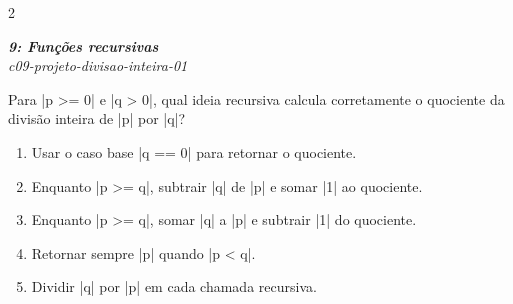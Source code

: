 \documentclass[a4paper,10pt,brazil]{article}
\begin{document}
\begin{multicols}{2}
\begin{enumerate}
\end{enumerate}

\begin{flushright}
  \footnotesize
  \textit{\textbf{9: Funções recursivas}}\\
  \textit{c09-projeto-divisao-inteira-01}\\

\end{flushright}
Para \haskellinline|p >= 0| e \haskellinline|q > 0|, qual ideia recursiva calcula corretamente o quociente da divisão inteira de \haskellinline|p| por \haskellinline|q|?

\begin{enumerate}
  \item Usar o caso base \haskellinline|q == 0| para retornar o quociente.

  \item Enquanto \haskellinline|p >= q|, subtrair \haskellinline|q| de \haskellinline|p| e somar \haskellinline|1| ao quociente.

  \item Enquanto \haskellinline|p >= q|, somar \haskellinline|q| a \haskellinline|p| e subtrair \haskellinline|1| do quociente.

  \item Retornar sempre \haskellinline|p| quando \haskellinline|p < q|.

  \item Dividir \haskellinline|q| por \haskellinline|p| em cada chamada recursiva.


\end{enumerate}


\end{multicols}
\end{document}
